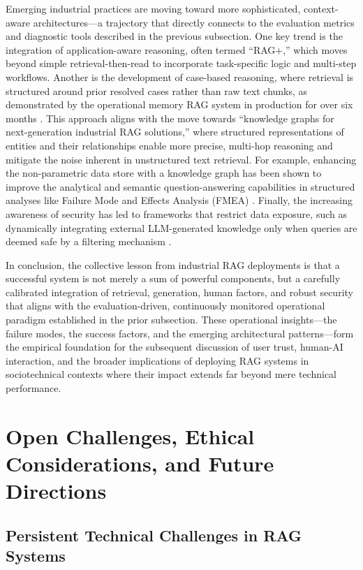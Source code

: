 \documentclass[11pt]{article}
\begin{document}
Emerging industrial practices are moving toward more sophisticated, context-aware architectures---a trajectory that directly connects to the evaluation metrics and diagnostic tools described in the previous subsection. One key trend is the integration of application-aware reasoning, often termed ``RAG+,'' which moves beyond simple retrieval-then-read to incorporate task-specific logic and multi-step workflows. Another is the development of case-based reasoning, where retrieval is structured around prior resolved cases rather than raw text chunks, as demonstrated by the operational memory RAG system in production for over six months \cite{ref594}. This approach aligns with the move towards ``knowledge graphs for next-generation industrial RAG solutions,'' where structured representations of entities and their relationships enable more precise, multi-hop reasoning and mitigate the noise inherent in unstructured text retrieval. For example, enhancing the non-parametric data store with a knowledge graph has been shown to improve the analytical and semantic question-answering capabilities in structured analyses like Failure Mode and Effects Analysis (FMEA) \cite{ref596}. Finally, the increasing awareness of security has led to frameworks that restrict data exposure, such as dynamically integrating external LLM-generated knowledge only when queries are deemed safe by a filtering mechanism \cite{ref505}.

In conclusion, the collective lesson from industrial RAG deployments is that a successful system is not merely a sum of powerful components, but a carefully calibrated integration of retrieval, generation, human factors, and robust security that aligns with the evaluation-driven, continuously monitored operational paradigm established in the prior subsection. These operational insights---the failure modes, the success factors, and the emerging architectural patterns---form the empirical foundation for the subsequent discussion of user trust, human-AI interaction, and the broader implications of deploying RAG systems in sociotechnical contexts where their impact extends far beyond mere technical performance.

\section{Open Challenges, Ethical Considerations, and Future Directions}

\subsection{Persistent Technical Challenges in RAG Systems}
\end{document}
